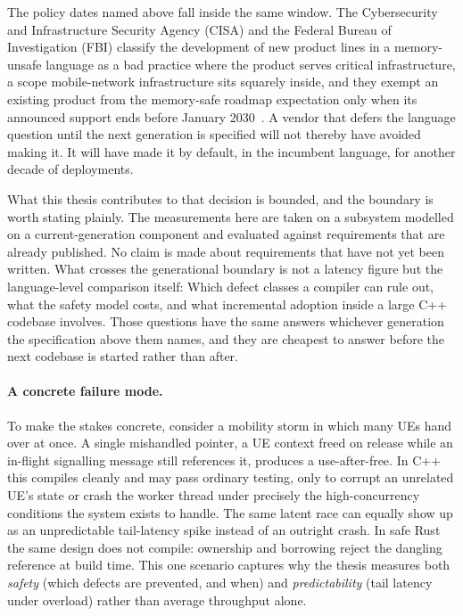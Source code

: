 \documentclass[english,twoside,openright,a4paper,censored,csm,software-track-2020]{HYthesisML}
\begin{document}
The policy dates named above fall inside the same window. The Cybersecurity and Infrastructure
Security Agency (CISA) and the Federal Bureau of Investigation (FBI) classify the
development of new product lines in a memory-unsafe language as a bad practice where the product
serves critical infrastructure, a scope mobile-network infrastructure sits squarely inside, and
they exempt an existing product from the memory-safe roadmap expectation only when its announced
support ends before January 2030~\cite{cisa2025badpractices}. A vendor that defers the language
question until the next generation is specified will not thereby have avoided making it. It will
have made it by default, in the incumbent language, for another decade of deployments.

What this thesis contributes to that decision is bounded, and the boundary is worth stating
plainly. The measurements here are taken on a subsystem modelled on a current-generation
component and evaluated against requirements that are already published. No claim is made about
requirements that have not yet been written. What crosses the generational boundary is not a
latency figure but the language-level comparison itself: Which defect classes a compiler can rule
out, what the safety model costs, and what incremental adoption inside a large C++ codebase
involves. Those questions have the same answers whichever generation the specification above them
names, and they are cheapest to answer before the next codebase is started rather than after.

\paragraph{A concrete failure mode.}
To make the stakes concrete, consider a mobility storm in which many UEs hand over at once. A
single mishandled pointer, a UE context freed on release while an in-flight signalling message
still references it, produces a use-after-free. In C++ this compiles cleanly and may pass
ordinary testing, only to corrupt an unrelated UE's state or crash the worker thread under
precisely the high-concurrency conditions the system exists to handle. The same latent race
can equally show up as an unpredictable tail-latency spike instead of an outright crash. In
safe Rust the same design does not compile: ownership and borrowing reject the dangling
reference at build time. This one scenario captures why the thesis measures both
\emph{safety} (which defects are prevented, and when) and \emph{predictability} (tail
latency under overload) rather than average throughput alone.
\end{document}

